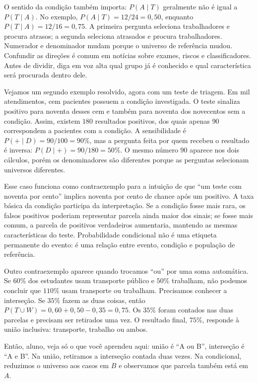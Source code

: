 O sentido da condição também importa: $P(A\mid T)$ geralmente não é igual a $P(T\mid A)$. No exemplo, $P(A\mid T)=12/24=0{,}50$, enquanto $P(T\mid A)=12/16=0{,}75$. A primeira pergunta seleciona trabalhadores e procura atrasos; a segunda seleciona atrasados e procura trabalhadores. Numerador e denominador mudam porque o universo de referência mudou. Confundir as direções é comum em notícias sobre exames, riscos e classificadores. Antes de dividir, diga em voz alta qual grupo já é conhecido e qual característica será procurada dentro dele.

Vejamos um segundo exemplo resolvido, agora com um teste de triagem. Em mil atendimentos, cem pacientes possuem a condição investigada. O teste sinaliza positivo para noventa desses cem e também para noventa dos novecentos sem a condição. Assim, existem $180$ resultados positivos, dos quais apenas $90$ correspondem a pacientes com a condição. A sensibilidade é $P(+\mid D)=90/100=90\%$, mas a pergunta feita por quem recebeu o resultado é inversa: $P(D\mid +)=90/180=50\%$. O mesmo número $90$ aparece nos dois cálculos, porém os denominadores são diferentes porque as perguntas selecionam universos diferentes.

Esse caso funciona como contraexemplo para a intuição de que ``um teste com noventa por cento'' implica noventa por cento de chance após um positivo. A taxa básica da condição participa da interpretação. Se a condição fosse mais rara, os falsos positivos poderiam representar parcela ainda maior dos sinais; se fosse mais comum, a parcela de positivos verdadeiros aumentaria, mantendo as mesmas características do teste. Probabilidade condicional não é uma etiqueta permanente do evento: é uma relação entre evento, condição e população de referência.

Outro contraexemplo aparece quando trocamos ``ou'' por uma soma automática. Se $60\%$ dos estudantes usam transporte público e $50\%$ trabalham, não podemos concluir que $110\%$ usam transporte ou trabalham. Precisamos conhecer a interseção. Se $35\%$ fazem as duas coisas, então $P(T\cup W)=0{,}60+0{,}50-0{,}35=0{,}75$. Os $35\%$ foram contados nas duas parcelas e precisam ser retirados uma vez. O resultado final, $75\%$, responde à união inclusiva: transporte, trabalho ou ambos.

\begin{SummaryBox}
Então, aluno, veja só o que você aprendeu aqui: união é ``A ou B'', interseção é ``A e B''. Na união, retiramos a interseção contada duas vezes. Na condicional, reduzimos o universo aos casos em $B$ e observamos que parcela também está em $A$.
\end{SummaryBox}

